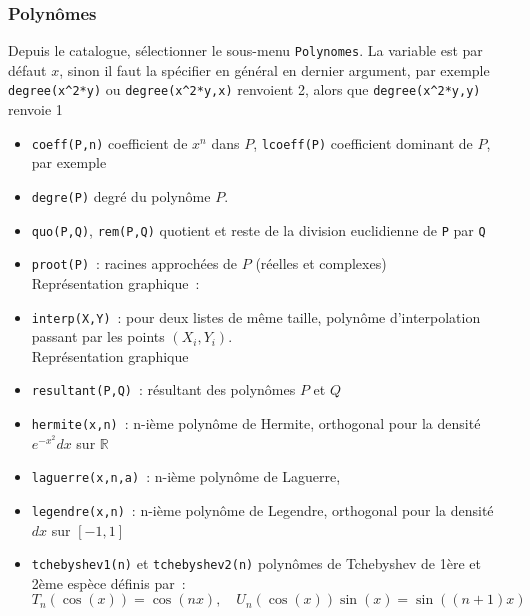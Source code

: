 \documentclass{article}
\newcommand{\R}{{\mathbb{R}}}
\newcommand{\R}{{\mathbb{R}}}
\begin{document}
\begin{giacjshere}
\subsubsection{Polyn\^omes}
Depuis le catalogue, s\'electionner le sous-menu \verb|Polynomes|.
La variable est par d\'efaut $x$, sinon il faut la sp\'ecifier en
g\'en\'eral en dernier argument, par exemple \verb|degree(x^2*y)|
ou \verb|degree(x^2*y,x)| renvoient 2, alors que \verb|degree(x^2*y,y)|
renvoie 1
\begin{itemize}
\item \verb|coeff(P,n)| coefficient de $x^n$ dans $P$, \verb|lcoeff(P)|
coefficient dominant de $P$, par exemple
\item \verb|degre(P)| degr\'e du polyn\^ome $P$.
\item \verb|quo(P,Q)|, \verb|rem(P,Q)| quotient et reste de la division
euclidienne de \verb|P| par \verb|Q|
\item \verb|proot(P)|~: racines approch\'ees de $P$ (r\'eelles et complexes)\\
Repr\'esentation graphique~:\\
\item \verb|interp(X,Y)|~: pour deux listes
de m\^eme taille, polyn\^ome d'interpolation
passant par les points $(X_i,Y_i)$. \\
Repr\'esentation graphique\\
\item \verb|resultant(P,Q)|~: r\'esultant des polyn\^omes
$P$ et $Q$
\item \verb|hermite(x,n)|~: n-i\`eme polyn\^ome de Hermite,
orthogonal pour la densit\'e $e^{-x^2}dx$ sur $\R$
\item \verb|laguerre(x,n,a)|~: n-i\`eme polyn\^ome de Laguerre,
\item \verb|legendre(x,n)|~: n-i\`eme polyn\^ome de Legendre,
orthogonal pour la densit\'e $dx$ sur $[-1,1]$
\item \verb|tchebyshev1(n)| et \verb|tchebyshev2(n)|
polyn\^omes de Tchebyshev de 1\`ere et 2\`eme esp\`ece
d\'efinis par~:
$$T_n(\cos(x))=\cos(nx), \quad U_n(\cos(x))\sin(x)=\sin((n+1)x)$$
\end{itemize}


\end{giacjshere}
\end{document}
